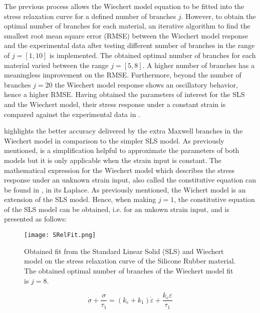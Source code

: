 The previous process allows the Wiechert model equation to be fitted into the stress relaxation curve for a defined number of branches $j$. However, to obtain the optimal number of branches for each material, an iterative algorithm to find the smallest root mean square error (RMSE) between the Wiechert model response and the experimental data after testing different number of branches in the range of $j=[1,10]$ is implemented. The obtained optimal number of branches for each material varied between the range $j=[5,8]$. A higher number of branches has a meaningless improvement on the RMSE. Furthermore, beyond the number of branches $j=20$ the Wiechert model response shows an oscillatory behavior, hence a higher RMSE. Having obtained the parameters of interest for the SLS and the Wiechert model, their stress response under a constant strain is compared against the experimental data in .

 highlights the better accuracy delivered by the extra Maxwell branches in the Wiechert model in comparison to the simpler SLS model. As previously mentioned,  is a simplification helpful to approximate the parameters of both models but it is only applicable when the strain input is constant. The mathematical expression for the Wiechert model which describes the stress response under an unknown strain input, also called the constitutive equation can be found in \cite{roylance2001engineering}, in its Laplace. 
As previously mentioned, the Wichert model is an extension of the SLS model. Hence, when making $j=1$, the constitutive equation of the SLS model can be obtained, i.e. for an unkown strain input, and is presented as follows:

\begin{figure}[htb!]
	\centering
    \texttt{[image: SRelFit.png]}
    \caption{Obtained fit from the Standard Linear Solid (SLS) and Wiechert model on the stress relaxation curve of the Silicone Rubber material. The obtained optimal number of branches of the Wiechert model fit is $j=8$.}
    \label{fig:StressRelFit}
\end{figure}

\begin{equation}
\label{eq3}
\dot{\sigma} + \frac{\sigma}{\tau_1} =  (k_e + k_1)\dot{\varepsilon} + \frac{k_e\varepsilon}{\tau_1}
\end{equation}

